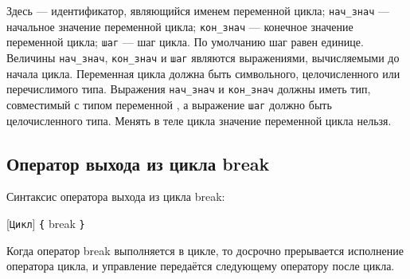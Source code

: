 \documentclass[10pt]{report}
\begin{document}
Здесь \textcolor{Green}{} --- идентификатор, являющийся именем переменной цикла; \texttt{нач_знач} --- начальное значение переменной цикла;
\texttt{кон_знач} --- конечное значение переменной цикла; \texttt{шаг} --- шаг цикла. По умолчанию шаг равен единице. Величины \texttt{нач_знач}, \texttt{кон_знач} и
\texttt{шаг} являются выражениями, вычисляемыми до начала цикла. Переменная цикла должна быть символьного, целочисленного или перечислимого типа. Выражения \texttt{нач_знач} и
\texttt{кон_знач} должны иметь тип, совместимый с типом переменной \textcolor{Green}{}, а выражение \texttt{шаг} должно быть целочисленного типа.
Менять в теле цикла значение переменной цикла нельзя.


    \subsection{Оператор выхода из цикла break}

Синтаксис оператора выхода из цикла break:
\begin{center}
\textcolor{Black}[\texttt{Цикл}]%
\textcolor{Black}{\texttt{\{}} break \textcolor{Black}{\texttt{\} }}
\end{center}
Когда оператор break выполняется в цикле, то досрочно прерывается исполнение оператора цикла, и управление передаётся следующему оператору после цикла.
         
\end{document}
